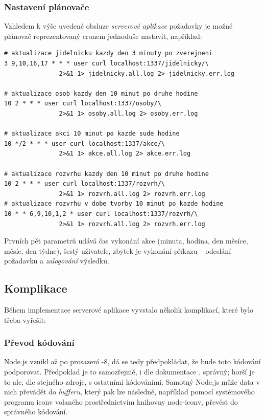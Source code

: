 \subsubsection{Nastavení plánovače}
\label{sec:server:scheduler}
Vzhledem k výše uvedené obsluze \textit{serverové aplikace}  požadavky je možné plánovač reprezentovaný cronem jednoduše nastavit, například:
\begin{verbatim}
# aktualizace jidelnicku kazdy den 3 minuty po zverejneni
3 9,10,16,17 * * * user curl localhost:1337/jidelnicky/\
               2>&1 1> jidelnicky.all.log 2> jidelnicky.err.log

# aktualizace osob kazdy den 10 minut po druhe hodine
10 2 * * * user curl localhost:1337/osoby/\
               2>&1 1> osoby.all.log 2> osoby.err.log

# aktualizace akci 10 minut po kazde sude hodine
10 */2 * * * user curl localhost:1337/akce/\
               2>&1 1> akce.all.log 2> akce.err.log

# aktualizace rozvrhu kazdy den 10 minut po druhe hodine
10 2 * * * user curl localhost:1337/rozvrh/\
               2>&1 1> rozvrh.all.log 2> rozvrh.err.log
# aktualizace rozvrhu v dobe tvorby 10 minut po kazde hodine
10 * * 6,9,10,1,2 * user curl localhost:1337/rozvrh/\
               2>&1 1> rozvrh.all.log 2> rozvrh.err.log
\end{verbatim}
Prvních pět parametrů udává čas vykonání akce (minuta, hodina, den měsíce, měsíc, den týdne), šestý uživatele, zbytek je vykonání příkazu -- odeslání požadavku a \textit{zalogování} výsledku.


\subsection{Komplikace}
Během implementace serverové aplikace vyvstalo několik komplikací, které bylo třeba vyřešit:

\subsubsection{Převod kódování}
Node.js vznikl až po prosazení -8, dá se tedy předpokládat, že bude toto kódování podporovat. Předpoklad je to samozřejmě, i dle dokumentace \cite{NodeEncoding}, správný; horší je to ale, dle stejného zdroje, s ostatními kódováními. Samotný Node.js může data v nich převádět do \textit{bufferu}, který pak lze následně, například pomocí systémového programu iconv volaného prostřednictvím knihovny node-iconv, převést do správného kódování.

